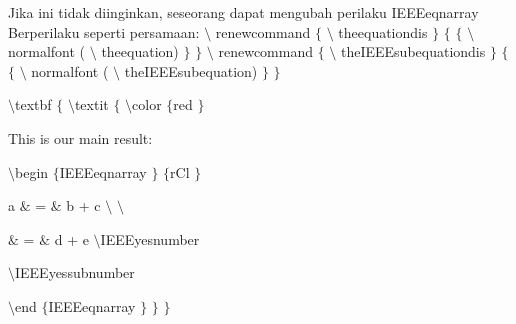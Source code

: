 Jika ini tidak diinginkan, seseorang dapat mengubah perilaku IEEEeqnarray Berperilaku seperti persamaan:  $  \setminus  $ renewcommand  $  \{  $ $  \setminus  $ theequationdis $  \}  $  $  \{  $ $  \{  $ $  \setminus  $ normalfont ( $  \setminus  $ theequation) $  \}  $ $  \}  $  $  \setminus  $ renewcommand  $  \{  $ $  \setminus  $ theIEEEsubequationdis $  \}  $  $  \{  $ $  \{  $ $  \setminus  $ normalfont ( $  \setminus  $ theIEEEsubequation) $  \}  $ $  \}  $ \par
\vspace{12pt}
\noindent 
 $  \setminus  $textbf $  \{  $ $  \setminus  $textit $  \{  $ $  \setminus  $color $  \{  $red $  \}  $ \par
\noindent 
This is our main result: \par
\noindent 
 $  \setminus  $begin $  \{  $IEEEeqnarray $  \}  $ $  \{  $rCl $  \}  $ \par
\noindent 
a  $  \&  $ =  $  \&  $ b + c  $  \setminus  $ $  \setminus  $ \par
\noindent 
 $  \&  $ =  $  \&  $ d + e  $  \setminus  $IEEEyesnumber \par
\noindent 
 $  \setminus  $IEEEyessubnumber \par
\noindent 
 $  \setminus  $end $  \{  $IEEEeqnarray $  \}  $ $  \}  $ $  \}  $ \par
\noindent 
\vspace{12pt}

